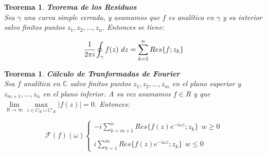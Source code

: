 \documentclass[a4paper,spanish]{article}
\def\Fou {\mathcal{F}}
\def\C {\mathbb{C}}
\newtheorem{teo}[prop]{Teorema}
\numberwithin{equation}{section}
\begin{document}
\begin{teo}\textbf{Teorema de los Residuos} 
\\
Sea $\gamma$ una curva simple cerrada, y asumamos que $f$ es anal\'itica en $\gamma$ y su interior salvo finitos puntos $z_1,z_2,\dots,z_n$. Entonces se tiene:

\[ \cfrac{1}{2\pi i} \oint_{\gamma}{f(z)} \ dz = \sum\limits_{k=1}^{n}{Res\lbrace{f;z_k}\rbrace}\]
\end{teo}

\begin{teo}\textbf{C\'alculo de Tranformadas de Fourier}
\\
Sea $f$ anal\'itica en $\C$ salvo finitos puntos $z_1,z_2,\dots,z_m$ en el plano superior y $z_{m+1},\dots,z_n$ en el plano inferior. A su vez asumamos $f \in R$ y que $\lim\limits_{R\rightarrow \infty}{\max\limits_{z \in C_R \cup C'_R} \vert{f(z)}\vert}=0$. Entonces:

\[ \Fou(f)(\omega) \left \lbrace \begin{array}{l}
 -i \sum \limits_{k= m+1}^{n}{Res \lbrace{ f\left(z\right) e^{-i \omega z};z_k} \rbrace} \ \ w\geq 0 \\
 \\
 i \sum\limits_{k=1}^{m}{Res \lbrace {f\left(z\right) e^{-i \omega z};z_k} \rbrace} \ \ w\leq 0 
\end{array} \right.
\]
\end{teo}
\end{document}
